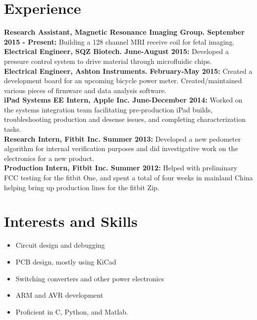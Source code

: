 \documentclass{res}
\begin{document}
\begin{resume}
\section{Experience}
	\vspace{0.05in}
	{\bf Research Assistant, Magnetic Resonance Imaging Group. September 2015 - Present:} Building a 128 channel MRI receive coil for fetal imaging. \vspace{0.05in}\\
	{\bf Electrical Engineer, SQZ Biotech. June-August 2015:} Developed a pressure control system to drive material through microfluidic chips. \vspace{0.05in}\\
	{\bf Electrical Engineer, Ashton Instruments. February-May 2015:} Created a development board for an upcoming bicycle power meter.  Created/maintained various pieces of firmware and data analysis software. \vspace{0.05in}\\
	{\bf iPad Systems EE Intern, Apple Inc. June-December 2014:} Worked on the systems integration team facilitating pre-production iPad builds, troubleshooting production and desense issues, and completing characterization tasks.\vspace{0.05in}\\
	{\bf Research Intern, Fitbit Inc. Summer 2013:} Developed a new pedometer algorithm for internal verification purposes and did investigative work on the electronics for a new product.\vspace{0.05in}\\
	{\bf Production Intern, Fitbit Inc. Summer 2012:} Helped with preliminary FCC testing for the fitbit One, and spent a total of four weeks in mainland China helping bring up production lines for the fitbit Zip.\\
\section{Interests and Skills}
\begin{itemize}

  \item Circuit design and debugging
  \item PCB design, mostly using KiCad
  \item Switching converters and other power electronics
  \item ARM and AVR development
  \item Proficient in C, Python, and Matlab.
\end{itemize}

\end{resume}
\end{document}
